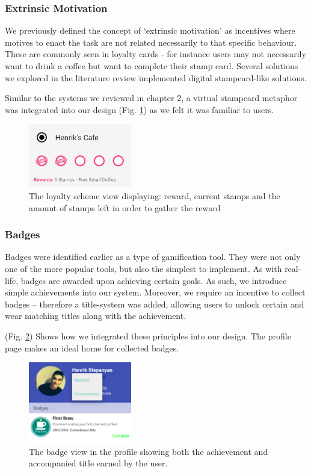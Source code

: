 \subsubsection{Extrinsic Motivation}
We previously defined the concept of `extrinsic motivation' as incentives where motives to enact the task are not related necessarily to that specific behaviour. These are commonly seen in loyalty cards - for instance users may not necessarily want to drink a coffee but want to complete their stamp card. Several solutions we explored in the literature review implemented digital stampcard-like solutions.

Similar to the systems we reviewed in chapter 2, a virtual stampcard metaphor was integrated into our design (Fig. \ref{fig:extrinsicmotivation}) as we felt it was familiar to users.
\begin{figure}[H]
 \centering
  \includegraphics[width=0.40\textwidth]{img/stampcardprogress.jpg}
     \caption{The loyalty scheme view displaying: reward, current stamps and the amount of stamps left in order to gather the reward}
     \label{fig:extrinsicmotivation}
\end{figure}
\subsubsection{Badges}
Badges were identified earlier as a type of gamification tool. They were not only one of the more popular tools, but also the simplest to implement. As with real-life, badges are awarded upon achieving certain goals. As such, we introduce simple achievements into our system. Moreover, we require an incentive to collect badges -- therefore a title-system was added, allowing users to unlock certain and wear matching titles along with the achievement.

(Fig. \ref{fig:badge}) Shows how we integrated these principles into our design. The profile page makes an ideal home for collected badges.

\begin{figure}[H]
 \centering
  \includegraphics[width=0.40\textwidth]{img/badge.png}
     \caption{The badge view in the profile showing both the achievement and accompanied title earned by the user.}
     \label{fig:badge}
\end{figure}
